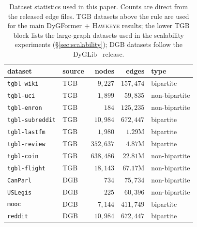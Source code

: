 \documentclass[sigconf,nonacm,review]{acmart}
\newcommand{\method}{\textsc{Hawkeye}\xspace}
\begin{document}
\begin{table}[t]
\caption{Dataset statistics used in this paper.  Counts are direct from
the released edge files. TGB datasets above the rule are used for the
main DyGFormer$\,+\,$\method results; the lower TGB block lists the
large-graph datasets used in the scalability experiments
(\S\ref{sec:scalability}); DGB datasets follow the
DyGLib~\cite{yu2023dygformer} release.}
\label{tab:datasets}
\centering\small
\setlength{\tabcolsep}{5pt}
\begin{tabular}{llrrl}
\toprule
dataset & source & nodes & edges & type \\
\midrule
\texttt{tgbl-wiki}      & TGB & $9{,}227$    & $157{,}474$  & bipartite \\
\texttt{tgbl-uci}       & TGB & $1{,}899$    & $59{,}835$   & non-bipartite \\
\texttt{tgbl-enron}     & TGB & $184$        & $125{,}235$  & non-bipartite \\
\texttt{tgbl-subreddit} & TGB & $10{,}984$   & $672{,}447$  & bipartite \\
\midrule
\texttt{tgbl-lastfm}    & TGB & $1{,}980$    & $1.29$M      & bipartite \\
\texttt{tgbl-review}    & TGB & $352{,}637$  & $4.87$M      & bipartite \\
\texttt{tgbl-coin}      & TGB & $638{,}486$  & $22.81$M     & non-bipartite \\
\texttt{tgbl-flight}    & TGB & $18{,}143$   & $67.17$M     & non-bipartite \\
\midrule
\texttt{CanParl}        & DGB & $734$        & $75{,}734$   & non-bipartite \\
\texttt{USLegis}        & DGB & $225$        & $60{,}396$   & non-bipartite \\
\texttt{mooc}           & DGB & $7{,}144$    & $411{,}749$  & bipartite \\
\texttt{reddit}         & DGB & $10{,}984$   & $672{,}447$  & bipartite \\
\bottomrule
\end{tabular}
\end{table}
\end{document}
